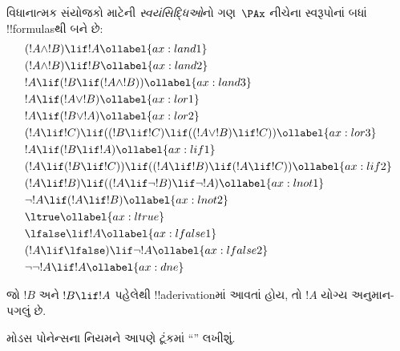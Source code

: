 \documentclass[../../../include/open-logic-section]{subfiles}
\begin{document}
      {}
      {}


\begin{defn}[સ્વયંસિદ્ધિઓ]
વિધાનાત્મક સંયોજકો માટેની \emph{સ્વયંસિદ્ધિઓ}નો ગણ~$\PAx$ નીચેના
સ્વરૂપોનાં બધાં !!{formula}sથી બને છે:
\begin{align}
  & (!A \land !B) \lif !A \ollabel{ax:land1}\\
  & (!A \land !B) \lif !B \ollabel{ax:land2}\\
  & !A \lif (!B \lif (!A \land !B)) \ollabel{ax:land3}\\
  & !A \lif (!A \lor !B) \ollabel{ax:lor1}\\
  & !A \lif (!B \lor !A) \ollabel{ax:lor2}\\
  & (!A \lif !C) \lif ((!B \lif !C) \lif ((!A \lor !B) \lif !C)) \ollabel{ax:lor3}\\
  & !A \lif (!B \lif !A) \ollabel{ax:lif1}\\
  & (!A \lif (!B \lif !C)) \lif ((!A \lif !B) \lif (!A \lif !C)) \ollabel{ax:lif2}\\
  & (!A \lif !B) \lif ((!A \lif \lnot !B) \lif \lnot !A) \ollabel{ax:lnot1}\\
  & \lnot !A \lif (!A \lif !B) \ollabel{ax:lnot2}\\
  & \ltrue \ollabel{ax:ltrue}\\
  & \lfalse \lif !A \ollabel{ax:lfalse1}\\
  & (!A \lif \lfalse) \lif \lnot !A \ollabel{ax:lfalse2}\\
  & \lnot\lnot !A \lif !A \ollabel{ax:dne}
\end{align}
\end{defn}


\begin{defn}[મોડસ પોનેન્સ]
  જો $!B$ અને $!B \lif !A$ પહેલેથી !!a{derivation}માં આવતાં હોય, તો
  $!A$ યોગ્ય અનુમાન-પગલું છે.
\end{defn}

મોડસ પોનેન્સના નિયમને આપણે ટૂંકમાં ``\MP'' લખીશું.
\end{document}
